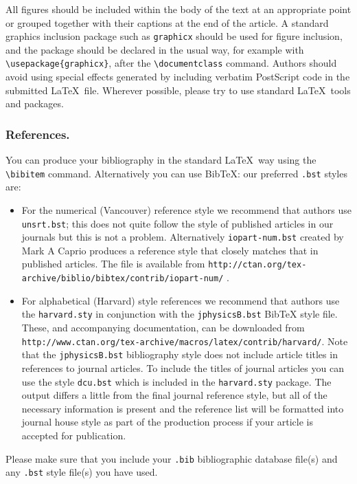 \documentclass[12pt]{iopart}
\begin{document}
\label{fig1}All figures should be included within the body of the text 
at an appropriate point or grouped together with their captions at the end of the article. A standard graphics inclusion package such as \verb"graphicx" should be used for figure inclusion, and the package should be declared in the usual
way, for example with \verb"\usepackage{graphicx}", after the \verb"\documentclass" command.
Authors should avoid using special effects generated by including verbatim
PostScript code in the submitted \LaTeX\ file. Wherever possible, please try to use standard \LaTeX\ tools 
and packages.

\subsubsection{References.\label{bibby}}
You can produce your bibliography in the standard \LaTeX\ way using the \verb"\bibitem" command. Alternatively
you can use BibTeX: our preferred  \verb".bst" styles are: 

\begin{itemize}
\item For the numerical (Vancouver) reference style we recommend that authors use 
 \verb"unsrt.bst"; this does not quite follow the style of published articles in our
 journals but this is not a problem.  Alternatively \verb"iopart-num.bst" created by Mark A Caprio
 produces a reference style that closely matches that in published articles.  The file is available from
\verb"http://ctan.org/tex-archive/biblio/bibtex/contrib/iopart-num/" .
\item For alphabetical (Harvard) style references we recommend that authors use the \verb"harvard.sty"
in conjunction with the \verb"jphysicsB.bst" BibTeX style file.  These, and accompanying documentation, can be downloaded
from  \verb"http://www.ctan.org/tex-archive/macros/latex/contrib/harvard/".
Note that the \verb"jphysicsB.bst" bibliography style does not include article titles
in references to journal articles.
To include the titles of journal articles you can use the style \verb"dcu.bst" which is included
in the \verb"harvard.sty" package.  The output differs a little from the final journal reference
style, but all of the necessary information is present and the reference list will be formatted
into journal house style as part of the production process if your article is accepted for publication.
\end{itemize}

\noindent Please make sure that you include your \verb".bib" bibliographic database file(s) and any 
\verb".bst" style file(s) you have used.
\end{document}
